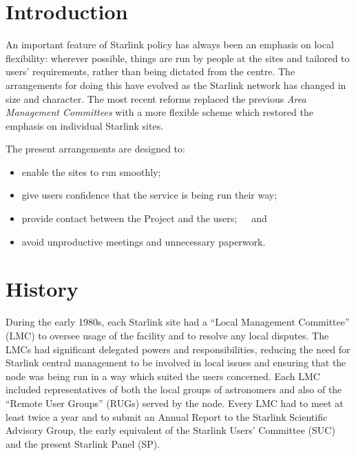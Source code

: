 \stardocabstract
 \begin{latexonly}
   \setlength{\parskip}{0mm}
   \latexonlytoc
   \setlength{\parskip}{\medskipamount}
   \markright{\stardocname}
 \end{latexonly}
\newpage
\renewcommand{\thepage}{\arabic{page}}
\setcounter{page}{1}

\section{Introduction}

An important feature of Starlink policy has always been
an emphasis on local flexibility:
wherever possible, things are run by people at the sites and tailored
to users' requirements, rather than being dictated from the centre.
The arrangements for doing this have evolved as the Starlink
network has changed in size and character. The most recent reforms
replaced the previous {\it Area Management Committees}\/ with a
more flexible scheme which
restored the emphasis on individual Starlink sites.

The present arrangements are designed to:
\begin{itemize}
\item enable the sites to run smoothly;
\item give users confidence that the service is being run their way;
\item provide contact between the Project and the users;~~~and
\item avoid unproductive meetings and unnecessary paperwork.
\end{itemize}

\section{History}

During the early 1980s, each Starlink site had a ``Local Management
Committee'' (LMC) to oversee usage of the facility and to resolve any local
disputes.  The LMCs had significant delegated powers and responsibilities,
reducing the need for Starlink central management to be involved in
local issues and ensuring that the node was being run in a way which
suited the users concerned.  Each LMC included representatives of both the
local groups of astronomers and also of the ``Remote User Groups'' (RUGs)
served by the node.  Every LMC had to meet at least
twice a year and to submit an Annual
Report to the Starlink Scientific Advisory Group, the early equivalent
of the Starlink Users' Committee (SUC) and the present Starlink Panel (SP).

